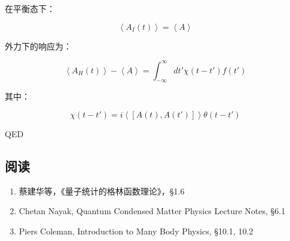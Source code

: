 \begin{enumerate}
在平衡态下：

\begin{equation}
\left\langle A_I (t) \right\rangle = \left\langle A \right\rangle
\end{equation}

外力下的响应为：

\begin{equation}
\left\langle A_H(t)\right\rangle - \left\langle A \right\rangle = \int_{-\infty}^{\infty} dt' \chi(t-t') f(t')
\end{equation}

其中：

\begin{equation*}
\chi(t-t')  = i \left\langle [A(t), A(t')] \right\rangle \theta(t-t')
\end{equation*}

QED


\end{enumerate}


\subsection*{阅读}

\begin{enumerate}
\item 

蔡建华等，《量子统计的格林函数理论》，\S 1.6

\item

Chetan Nayak, Quantum Condensed Matter Physics Lecture Notes, \S 6.1


\item

Piers Coleman, Introduction to Many Body Physics, \S 10.1, 10.2

\end{enumerate}

